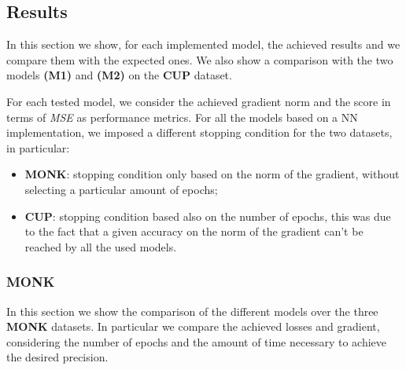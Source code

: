 \subsection{Results}
\label{sec:res}
In this section we show, for each implemented model, the achieved results and we compare them with the expected ones. We also show a comparison with the two models \textbf{(M1)} and \textbf{(M2)} on the \textbf{CUP} dataset.

For each tested model, we consider the achieved gradient norm and the score in terms of \textit{MSE} as performance metrics. For all the models based on a NN implementation, we imposed a different stopping condition for the two datasets, in particular:
\begin{itemize}
    \item \textbf{MONK}: stopping condition only based on the norm of the gradient, without selecting a particular amount of epochs;
    \item \textbf{CUP}: stopping condition based also on the number of epochs, this was due to the fact that a given accuracy on the norm of the gradient can't be reached by all the used models.
\end{itemize}

\subsubsection{MONK}
In this section we show the comparison of the different models over the three \textbf{MONK} datasets. In particular we compare the achieved losses and gradient, considering the number of epochs and the amount of time necessary to achieve the desired precision.

